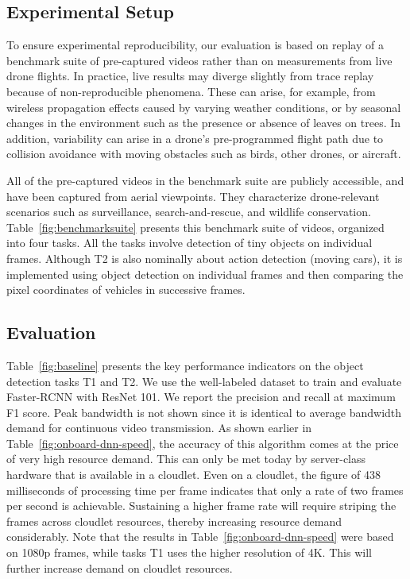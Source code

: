 \subsection{Experimental Setup}
\label{sec:dumbdrone-setup}

To ensure experimental reproducibility, our evaluation is based on
replay of a benchmark suite of pre-captured videos rather than on
measurements from live drone flights.  In practice, live results may
diverge slightly from trace replay because of non-reproducible
phenomena.  These can arise, for example, from wireless propagation
effects caused by varying weather conditions, or by seasonal changes
in the environment such as the presence or absence of leaves on trees.
In addition, variability can arise in a  drone's pre-programmed flight
path due to collision avoidance with moving obstacles such as birds,
other drones, or aircraft.

All of the pre-captured videos in the benchmark suite are publicly accessible,
and have been captured from aerial viewpoints. They characterize drone-relevant
scenarios such as surveillance, search-and-rescue, and wildlife conservation.
Table~\ref{fig:benchmarksuite} presents this benchmark suite of videos,
organized into four tasks. All the tasks involve detection of tiny objects on
individual frames. Although T2 is also nominally about action detection (moving
cars), it is implemented using object detection on individual frames and then
comparing the pixel coordinates of vehicles in successive frames.

\subsection{Evaluation}
\label{sec:dumbdrone-results}

Table~\ref{fig:baseline} presents the key performance indicators on the object
detection tasks T1 and T2. We use the well-labeled dataset to train and evaluate
Faster-RCNN with ResNet 101. We report the precision and recall at maximum F1
score.  Peak bandwidth is not shown since it is identical to average bandwidth
demand for continuous video transmission.  As shown earlier in
Table~\ref{fig:onboard-dnn-speed}, the accuracy of this algorithm comes at the
price of very high resource demand.  This can only be met today by server-class
hardware that is available in a cloudlet.  Even on a cloudlet, the figure of 438
milliseconds of processing time per frame indicates that only a rate of two
frames per second is achievable.  Sustaining a higher frame rate will require
striping the frames across cloudlet resources, thereby increasing resource
demand considerably.  Note that the results in
Table~\ref{fig:onboard-dnn-speed} were based on 1080p frames, while tasks T1
uses the higher resolution of 4K. This will further increase demand on cloudlet
resources.

